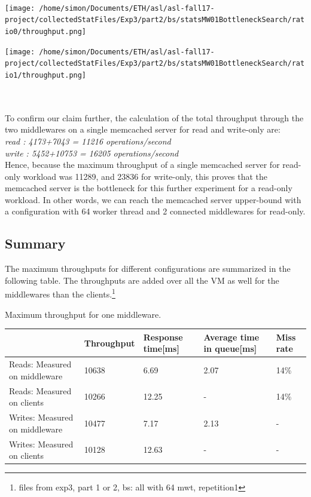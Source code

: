 \documentclass[11pt,a4paper]{article}
\begin{document}
\\
\begin{minipage}{0.5\linewidth}
\texttt{[image: /home/simon/Documents/ETH/asl/asl-fall17-project/collectedStatFiles/Exp3/part2/bs/statsMW01BottleneckSearch/ratio0/throughput.png]}
\end{minipage}
\hfill
\begin{minipage}{0.5\linewidth}
\texttt{[image: /home/simon/Documents/ETH/asl/asl-fall17-project/collectedStatFiles/Exp3/part2/bs/statsMW01BottleneckSearch/ratio1/throughput.png]}
\end{minipage}
\\\\
To confirm our claim further, the calculation of the total throughput through the two middlewares on a single memcached server for read and write-only are:
\\\textit{read : 4173+7043 = 11216 operations/second}
\\\textit{write : 5452+10753 = 16205 operations/second}
\\
Hence, because the maximum throughput of a single memcached server for read-only workload was 11289, and 23836 for write-only, this proves that the memcached server is the bottleneck for this further experiment for a read-only workload. In other words, we can reach the memcached server upper-bound with a configuration with 64 worker thread and 2 connected middlewares for read-only. 



\subsection{Summary}
The maximum throughputs for different configurations are summarized in the following table. The throughputs are added over all the VM as well for the middlewares than the clients.\footnote{files from exp3, part 1 or 2, bs: all with 64 mwt, repetition1} 

\begin{center}
	{Maximum throughput for one middleware.}
	\begin{tabular}{|l|p{2cm}|p{2cm}|p{2cm}|p{2cm}|}
		\hline                                & Throughput& Response time[ms] & Average time in queue[ms] & Miss rate \\ 
		\hline Reads: Measured on middleware  &10638           &6.69              &2.07                       &14\%           \\ 
		\hline Reads: Measured on clients     &10266            &12.25               &-                  &14\%           \\ 
		\hline Writes: Measured on middleware &10477            &7.17               &2.13                       &-      \\ 
		\hline Writes: Measured on clients    &10128            &12.63               &-                  &-       \\ 
		\hline 
	\end{tabular}
\end{center}
\end{document}
